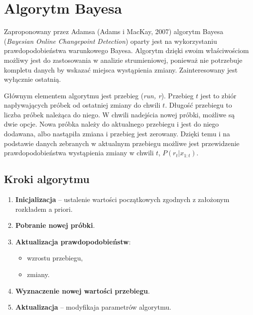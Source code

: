 \section{Algorytm Bayesa}
\label{sec:Bayes}
Zaproponowany przez Adamsa (Adams i MacKay, 2007) algorytm Bayesa (\textit{Bayesian Online Changepoint Detection})
oparty jest na wykorzystaniu prawdopodobieństwa warunkowego Bayesa.
Algorytm dzięki swoim właściwościom możliwy jest do zastosowania w analizie strumieniowej,
ponieważ nie potrzebuje kompletu danych by wskazać miejsca wystąpienia zmiany.
Zainteresowany jest wyłącznie ostatnią.

Głównym elementem algorytmu jest przebieg (\textit{run, r}).
Przebieg $t$ jest to zbiór napływających próbek od ostatniej zmiany do chwili $t$.
Długość przebiegu to liczba próbek należąca do niego.
W chwili nadejścia nowej próbki,
możliwe są dwie opcje.
Nowa próbka należy do aktualnego przebiegu i jest do niego dodawana,
albo nastąpiła zmiana i przebieg jest zerowany.
Dzięki temu i na podstawie danych zebranych w aktualnym przebiegu
możliwe jest przewidzenie prawdopodobieństwa wystąpienia zmiany w chwili $t$,
$P(r_t|x_{1:t})$.

\subsection*{Kroki algorytmu}
\begin{enumerate}
  \item \textbf{Inicjalizacja} -- ustalenie wartości początkowych zgodnych z założonym rozkładem a priori.
  \item \textbf{Pobranie nowej próbki}.
  \item \textbf{Aktualizacja prawdopodobieństw}:
    \begin{itemize}
      \item wzrostu przebiegu,
      \item zmiany.
    \end{itemize}
  \item \textbf{Wyznaczenie nowej wartości przebiegu}.
  \item \textbf{Aktualizacja} -- modyfikaja parametrów algorytmu.
\end{enumerate}
